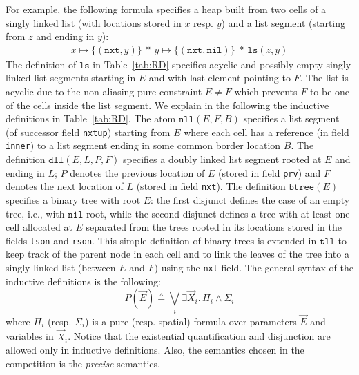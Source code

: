 \documentclass[twoside,11pt]{article}
\newcommand{\sep}{.\,}
\newcommand{\posep}{*}
\newcommand{\points}{\mapsto}
\newcommand{\nil}{\mathtt{nil}}
\newcommand{\ls}{\mathtt{ls}}
\newcommand{\dll}{\mathtt{dll}}
\newcommand{\nll}{\mathtt{nll}}
\begin{document}
For example, the following formula specifies a heap built from two cells of a singly linked list
(with locations stored in $x$ resp. $y$) and a list segment (starting from $z$ and ending in $y$):
\begin{align}
x \points \{(\texttt{nxt},y)\} \ \posep\ y \points \{(\texttt{nxt},\nil)\} \ \posep\ \ls(z,y)
\end{align}
The definition of $\ls$ in Table~\ref{tab:RD} specifies acyclic and possibly empty singly linked list segments starting in $E$ and with last element pointing to $F$.
The list is acyclic due to the non-aliasing pure constraint $E\neq F$ which prevents $F$ to be one of the cells inside the list segment.
%
We explain in the following the inductive definitions in Table~\ref{tab:RD}.
%
The atom $\nll(E,F,B)$ specifies a list segment (of successor field \texttt{nxtup}) starting from $E$ where each cell has a reference (in field \texttt{inner}) to a list segment ending in some common border location $B$. 
%
The definition $\dll(E,L,P,F)$ specifies a doubly linked list segment rooted at $E$ and ending in $L$; $P$ denotes the previous location of $E$ (stored in field \texttt{prv}) and $F$ denotes the next location of $L$  (stored in field \texttt{nxt}).
%
The definition $\mathtt{btree}(E)$ specifies a binary tree with root $E$:
the first disjunct defines the case of an empty tree, i.e., with $\nil$ root, while the second disjunct defines a tree with at least one cell allocated at $E$ separated from the trees rooted in its locations stored in the fields \texttt{lson} and \texttt{rson}.
%
This simple definition of binary trees is extended in $\mathtt{tll}$ to keep track of the parent node in each cell and to link the leaves of the tree into a singly linked list (between $E$ and $F$) using the \texttt{nxt} field.
%
The general syntax of the inductive definitions is the following:
\begin{equation}\label{eq:RD}
P(\vec{E}) \triangleq \bigvee_i \exists \vec{X}_i\sep \Pi_i \land \Sigma_i
\end{equation}
\noindent where $\Pi_i$ (resp. $\Sigma_i$) is a pure (resp. spatial) formula over parameters $\vec{E}$ and variables in $\vec{X}_i$.
Notice that the existential quantification and disjunction are allowed only in inductive definitions. 
Also, the semantics chosen in the competition is the \emph{precise} semantics.
\end{document}
